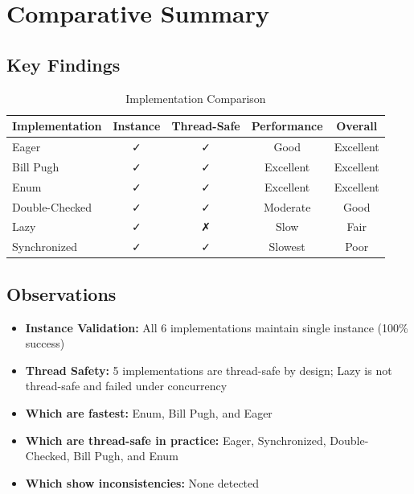 \documentclass[12pt,a4paper]{article}
\begin{document}
\section{Comparative Summary}

\subsection{Key Findings}

\begin{table}[H]
\centering
\caption{Implementation Comparison}
\label{tab:summary}
\begin{tabular}{|l|c|c|c|c|}
\hline
\textbf{Implementation} & \textbf{Instance} & \textbf{Thread-Safe} & \textbf{Performance} & \textbf{Overall} \\
\hline\hline
Eager & ✓ & ✓ & Good & Excellent \\
Bill Pugh & ✓ & ✓ & Excellent & Excellent \\
Enum & ✓ & ✓ & Excellent & Excellent \\
Double-Checked & ✓ & ✓ & Moderate & Good \\
Lazy & ✓ & ✗ & Slow & Fair \\
Synchronized & ✓ & ✓ & Slowest & Poor \\
\hline
\end{tabular}
\end{table}

\subsection{Observations}

\begin{itemize}
    \item \textbf{Instance Validation:} All 6 implementations maintain single instance (100\% success)
    \item \textbf{Thread Safety:} 5 implementations are thread-safe by design; Lazy is not thread-safe and failed under concurrency
    \item \textbf{Which are fastest:} Enum, Bill Pugh, and Eager
    \item \textbf{Which are thread-safe in practice:} Eager, Synchronized, Double-Checked, Bill Pugh, and Enum
    \item \textbf{Which show inconsistencies:} None detected
\end{itemize}
\end{document}
